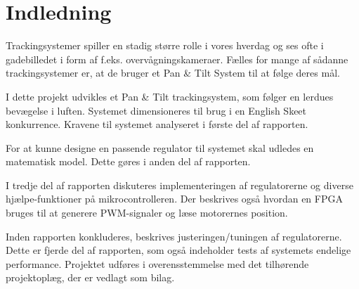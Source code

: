 \section*{Indledning}
Trackingsystemer spiller en stadig større rolle i vores hverdag og ses ofte i gadebilledet i form 
af f.eks. overvågningskameraer.
Fælles for mange af sådanne trackingsystemer er, at de bruger et Pan \& Tilt System til at følge deres mål. 

I dette projekt udvikles et Pan \& Tilt trackingsystem, som følger en lerdues bevægelse i 
luften. Systemet dimensioneres til brug i en English Skeet konkurrence. Kravene til systemet analyseret i første del af rapporten. 

For at kunne designe en passende regulator til systemet skal udledes en matematisk model. Dette gøres i anden del af rapporten. 

I tredje del af rapporten diskuteres implementeringen af regulatorerne og diverse hjælpe-funktioner på mikrocontrolleren. Der beskrives også hvordan en FPGA bruges til at generere PWM-signaler og læse motorernes position. 

Inden rapporten konkluderes, beskrives justeringen/tuningen af regulatorerne. Dette er fjerde del af rapporten, som også indeholder tests af systemets endelige performance. 
Projektet udføres i overensstemmelse med det tilhørende projektoplæg, der er vedlagt 
som bilag.
